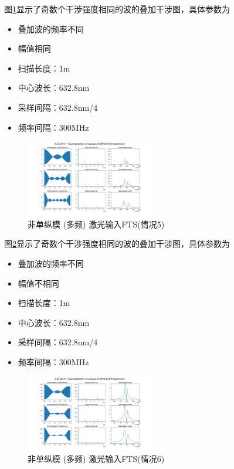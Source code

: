 \documentclass[conference]{IEEEtran}
\begin{document}
图\ref{pic14}显示了奇数个干涉强度相同的波的叠加干涉图，具体参数为
\begin{itemize}
    \item 叠加波的频率不同
    \item 幅值相同
    \item 扫描长度：1m
    \item 中心波长：632.8nm
    \item 采样间隔：632.8nm/4
    \item 频率间隔：300MHz
\end{itemize}
\begin{figure}[htbp]
    \centerline{\includegraphics[width=0.5\textwidth]{pic14.png}}
    \caption{非单纵模 (多频) 激光输入FTS(情况5)}
    \label{pic14}
\end{figure}


图\ref{pic15}显示了奇数个干涉强度相同的波的叠加干涉图，具体参数为
\begin{itemize}
    \item 叠加波的频率不同
    \item 幅值不相同
    \item 扫描长度：1m
    \item 中心波长：632.8nm
    \item 采样间隔：632.8nm/4
    \item 频率间隔：300MHz
\end{itemize}
\begin{figure}[htbp]
    \centerline{\includegraphics[width=0.5\textwidth]{pic15.png}}
    \caption{非单纵模 (多频) 激光输入FTS(情况6)}
    \label{pic15}
\end{figure}
\end{document}
